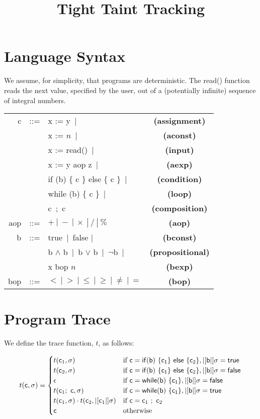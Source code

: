 \documentclass[]{article}
\title{Tight Taint Tracking}
\author{}
\newcommand{\lsyn}{|[}
\newcommand{\rsyn}{|]}
\begin{document}
\maketitle

\section{Language Syntax}

We assume, for simplicity, that programs are deterministic. The {\sf read()} function reads the next value, specified by the user, out of a (potentially infinite) sequence of integral numbers.

\begin{tabular}{rclc}
{\sf c} & ::= & {\sf x := y}\ $|$ & {\bf (assignment)}\\
		 & 		 & {\sf x := $n$}\ $|$ & {\bf (aconst)}\\
		 & 		 & {\sf x := read()}\ $|$ & {\bf (input)}\\
		 & 		 & {\sf x := y aop z}\ $|$ & {\bf (aexp)}\\
		  & 	 & {\sf if (b) \{ c \} else \{ c \}}\ $|$ & {\bf (condition)}\\
		  & 	 & {\sf while (b) \{ c \}}\ $|$ & {\bf (loop)}\\
		  & 	 & {\sf c\ ;\ c} & {\bf (composition)}\\
{\sf aop} & ::= & $+\ |\ -\ |\ \times\ |\ /\ |\ \%$ & {\bf (aop)} \\
{\sf b} & ::= & {\sf true}\ $|$\ {\sf false} $|$ & {\bf (bconst)} \\
		 & 		 & {\sf b} $\wedge$ {\sf b}\ $|$\ {\sf b} $\vee$ {\sf b}\ $|$\ $\neg${\sf b}\ $|$ & {\bf (propositional)} \\
		 &        & {\sf x bop $n$}	& {\bf (bexp)}\\
{\sf bop} & ::= & $<\ |\ >\ |\ \leq\ |\ \geq\ |\ \neq\ |\ =$ & {\bf (bop)}
\end{tabular}

\section{Program Trace}

We define the trace function, $t$, as follows:

\[ 
t({\sf c},\sigma) = \begin{cases} 
t({\sf c}_1,\sigma) &\mbox{if } {\sf c}={\sf if (b)\ \{ c_1 \}\ else\ \{ c_2 \}},\lsyn {\sf b} \rsyn\sigma = {\sf true} \\ 
t({\sf c}_2,\sigma) &\mbox{if } {\sf c}={\sf if (b)\ \{ c_1 \}\ else\ \{ c_2 \}},\lsyn {\sf b} \rsyn\sigma = {\sf false} \\ 
\epsilon &\mbox{if } {\sf c}={\sf while (b)\ \{ c_1 \}},\lsyn {\sf b} \rsyn\sigma = {\sf false} \\ 
t({\sf c}_1 ;\ {\sf c},\sigma) &\mbox{if } {\sf c}={\sf while (b)\ \{ c_1 \}},\lsyn {\sf b} \rsyn\sigma = {\sf true} \\ 
t({\sf c}_1,\sigma) \cdot t({\sf c}_2,\lsyn {\sf c}_1 \rsyn \sigma) &\mbox{if } {\sf c}={\sf c}_1\ ;\ {\sf c}_2 \\ 
{\sf c} & \mbox{otherwise}
\end{cases}
\]
\end{document}
